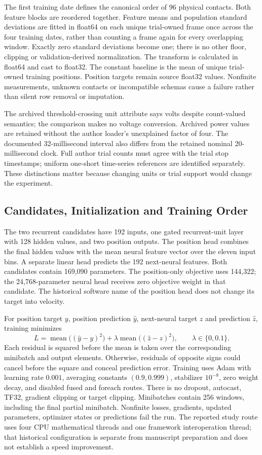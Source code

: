 The first training date defines the canonical order of 96 physical contacts.
Both feature blocks are reordered together. Feature means and population
standard deviations are fitted in float64 on each unique trial-owned frame
once across the four training dates, rather than counting a frame again for
every overlapping window. Exactly zero standard deviations become one; there
is no other floor, clipping or validation-derived normalization. The transform
is calculated in float64 and cast to float32. The constant baseline is the
mean of unique trial-owned training positions. Position targets remain source
float32 values. Nonfinite measurements, unknown contacts or incompatible
schemas cause a failure rather than silent row removal or imputation.

The archived threshold-crossing unit attribute says volts despite count-valued
semantics; the comparison makes no voltage conversion. Archived power values
are retained without the author loader's unexplained factor of four. The
documented 32-millisecond interval also differs from the retained nominal
20-millisecond clock. Full author trial counts must agree with the trial stop
timestamps; uniform one-short time-series references are identified separately.
These distinctions matter because changing units or trial support would change
the experiment.

\subsection{Candidates, Initialization and Training Order}

The two recurrent candidates have 192 inputs, one gated recurrent-unit layer
with 128 hidden values, and two position outputs. The position head combines
the final hidden values with the mean neural feature vector over the eleven
input bins. A separate linear head predicts the 192 next-neural features.
Both candidates contain 169,090 parameters. The position-only objective uses
144,322; the 24,768-parameter neural head receives zero objective weight in that
candidate. The historical software name of the position head does not change
its target into velocity.

For position target $y$, position prediction $\widehat y$, next-neural target
$z$ and prediction $\widehat z$, training minimizes
\[
 L=\operatorname{mean}\bigl((\widehat y-y)^2\bigr)
   +\lambda\operatorname{mean}\bigl((\widehat z-z)^2\bigr),
 \qquad \lambda\in\{0,0.1\}.
\]
Each residual is squared before the mean is taken over the corresponding
minibatch and output elements. Otherwise, residuals of opposite signs could
cancel before the square and conceal prediction error. Training
uses Adam with learning rate $0.001$, averaging constants $(0.9,0.999)$,
stabilizer $10^{-8}$, zero weight decay, and disabled fused and foreach routes.
There is no dropout, autocast, TF32, gradient clipping or target clipping.
Minibatches contain 256 windows, including the final partial minibatch.
Nonfinite losses, gradients, updated parameters, optimizer states or predictions
fail the run. The reported study route uses four CPU mathematical threads and
one framework interoperation thread; that historical configuration is separate
from manuscript preparation and does not establish a speed improvement.

